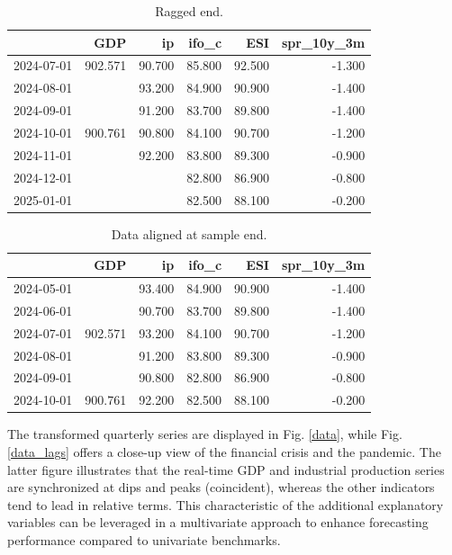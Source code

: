 \documentclass[a4paper]{article}
\begin{document}
\begin{table}[ht]
\centering
\begin{tabular}{rrrrrr}
  \hline
 & GDP & ip & ifo\_c & ESI & spr\_10y\_3m \\ 
  \hline
2024-07-01 & 902.571 & 90.700 & 85.800 & 92.500 & -1.300 \\ 
  2024-08-01 &  & 93.200 & 84.900 & 90.900 & -1.400 \\ 
  2024-09-01 &  & 91.200 & 83.700 & 89.800 & -1.400 \\ 
  2024-10-01 & 900.761 & 90.800 & 84.100 & 90.700 & -1.200 \\ 
  2024-11-01 &  & 92.200 & 83.800 & 89.300 & -0.900 \\ 
  2024-12-01 &  &  & 82.800 & 86.900 & -0.800 \\ 
  2025-01-01 &  &  & 82.500 & 88.100 & -0.200 \\ 
   \hline
\end{tabular}
\caption{Ragged end.  } 
\label{f_stat}
\end{table}%
\begin{table}[ht]
\centering
\begin{tabular}{rrrrrr}
  \hline
 & GDP & ip & ifo\_c & ESI & spr\_10y\_3m \\ 
  \hline
2024-05-01 &  & 93.400 & 84.900 & 90.900 & -1.400 \\ 
  2024-06-01 &  & 90.700 & 83.700 & 89.800 & -1.400 \\ 
  2024-07-01 & 902.571 & 93.200 & 84.100 & 90.700 & -1.200 \\ 
  2024-08-01 &  & 91.200 & 83.800 & 89.300 & -0.900 \\ 
  2024-09-01 &  & 90.800 & 82.800 & 86.900 & -0.800 \\ 
  2024-10-01 & 900.761 & 92.200 & 82.500 & 88.100 & -0.200 \\ 
   \hline
\end{tabular}
\caption{Data aligned at sample end.} 
\label{f_stat}
\end{table}

The transformed quarterly series are displayed in Fig. \ref{data}, while Fig. \ref{data_lags} offers a close-up view of the financial crisis and the pandemic. The latter figure illustrates that the real-time GDP and industrial production series are synchronized at dips and peaks (coincident), whereas the other indicators tend to lead in relative terms. This characteristic of the additional explanatory variables can be leveraged in a multivariate approach to enhance forecasting performance compared to univariate benchmarks. 
\end{document}
